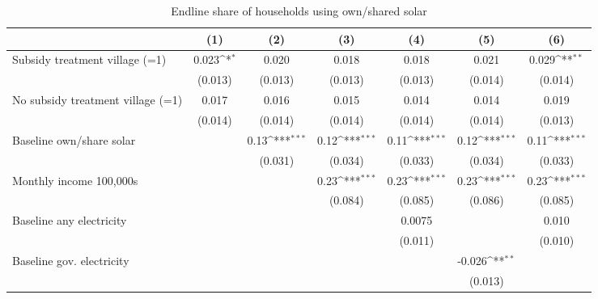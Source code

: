 \begin{table}[htbp]\centering
\def\sym#1{\ifmmode^{#1}\else\(^{#1}\)\fi}
\caption{Endline share of households using own/shared solar}
\begin{tabular*}{1\hsize}{@{\hskip\tabcolsep\extracolsep\fill}l*{6}{c}}
\toprule
                &\multicolumn{1}{c}{(1)}         &\multicolumn{1}{c}{(2)}         &\multicolumn{1}{c}{(3)}         &\multicolumn{1}{c}{(4)}         &\multicolumn{1}{c}{(5)}         &\multicolumn{1}{c}{(6)}         \\
\midrule
Subsidy treatment village (=1)&    0.023\sym{*}  &    0.020         &    0.018         &    0.018         &    0.021         &    0.029\sym{**} \\
                &  (0.013)         &  (0.013)         &  (0.013)         &  (0.013)         &  (0.014)         &  (0.014)         \\
No subsidy treatment village (=1)&    0.017         &    0.016         &    0.015         &    0.014         &    0.014         &    0.019         \\
                &  (0.014)         &  (0.014)         &  (0.014)         &  (0.014)         &  (0.014)         &  (0.013)         \\
Baseline own/share solar&                  &     0.13\sym{***}&     0.12\sym{***}&     0.11\sym{***}&     0.12\sym{***}&     0.11\sym{***}\\
                &                  &  (0.031)         &  (0.034)         &  (0.033)         &  (0.034)         &  (0.033)         \\
Monthly income 100,000s&                  &                  &     0.23\sym{***}&     0.23\sym{***}&     0.23\sym{***}&     0.23\sym{***}\\
                &                  &                  &  (0.084)         &  (0.085)         &  (0.086)         &  (0.085)         \\
Baseline any electricity&                  &                  &                  &   0.0075         &                  &    0.010         \\
                &                  &                  &                  &  (0.011)         &                  &  (0.010)         \\
Baseline gov. electricity&                  &                  &                  &                  &   -0.026\sym{**} &                  \\
                &                  &                  &                  &                  &  (0.013)         &                  \\

\end{tabular*}
\end{table}
